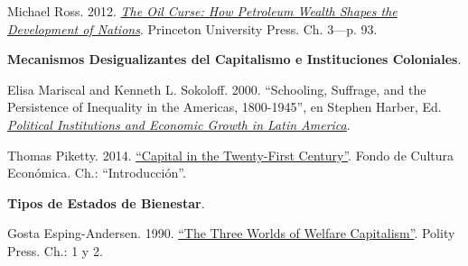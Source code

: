 \documentclass[letterpaper]{article}
\renewenvironment{itemize}{
  \begin{list}{}{
    \setlength{\leftmargin}{1.5em}
  }
}{
  \end{list}
}
\begin{document}
\begin{enumerate}[label=\roman*.]
\begin{itemize}
\begin{itemize}
          \item[$\circ$] Michael Ross. 2012. \href{https://github.com/hbahamonde/Ciencia_Politica_II/raw/master/Readings/Ross_2012.epub}{\emph{The Oil Curse: How Petroleum Wealth Shapes the Development of Nations}}. Princeton University Press. Ch. 3---p. 93.
        \end{itemize}

		\end{itemize}



	\item {}
		\begin{itemize}

			\item[15.] {\bf Mecanismos Desigualizantes del Capitalismo e Instituciones Coloniales}.
				\begin{itemize}
					\item[$\circ$] Elisa Mariscal and Kenneth L. Sokoloff. 2000. ``Schooling, Suffrage, and the Persistence of Inequality in the Americas, 1800-1945'', en Stephen Harber, Ed. \href{https://github.com/hbahamonde/Ciencia_Politica_II/raw/master/Readings/Political_Institutions_Haber.pdf}{\emph{Political Institutions and Economic Growth in Latin America}}.
          \item[$\circ$] Thomas Piketty. 2014.  \href{https://github.com/hbahamonde/Ciencia_Politica_II/raw/master/Readings/Piketty_El_capital.pdf}{``Capital in the Twenty-First Century''}. Fondo de Cultura Econ\'omica. Ch.: ``Introducci\'on''.
				\end{itemize}


			\item[16.] {\bf Tipos de Estados de Bienestar}.
				\begin{itemize}
          \item[$\circ$] Gosta Esping-Andersen. 1990. \href{https://github.com/hbahamonde/Ciencia_Politica_II/raw/master/Readings/Esping_Andersen.pdf}{``The Three Worlds of Welfare Capitalism''}. Polity Press. Ch.: 1 y 2.
        \end{itemize}



\end{itemize}
\end{enumerate}
\end{document}
